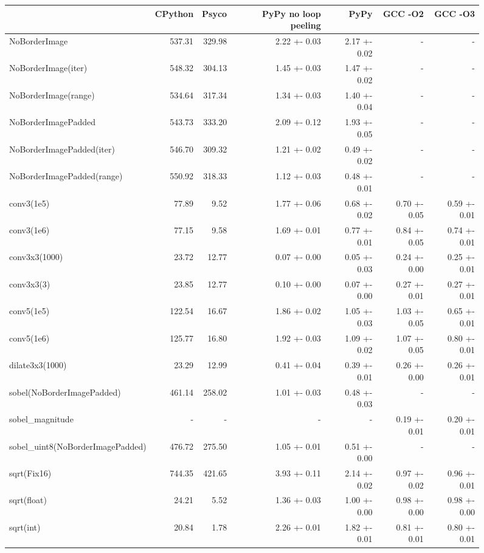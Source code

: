 \documentclass[preprint]{sigplanconf}
\begin{document}
\begin{figure}
\begin{center}
{\small
\begin{tabular}{|l|r|r|r|r|r|r|}
\hline
 & CPython & Psyco & PyPy no loop peeling & PyPy & GCC -O2 & GCC -O3\\
\hline
NoBorderImage & 537.31 & 329.98 & 2.22 +- 0.03 & 2.17 +- 0.02 & - & -\\
\hline
NoBorderImage(iter) & 548.32 & 304.13 & 1.45 +- 0.03 & 1.47 +- 0.02 & - & -\\
\hline
NoBorderImage(range) & 534.64 & 317.34 & 1.34 +- 0.03 & 1.40 +- 0.04 & - & -\\
\hline
NoBorderImagePadded & 543.73 & 333.20 & 2.09 +- 0.12 & 1.93 +- 0.05 & - & -\\
\hline
NoBorderImagePadded(iter) & 546.70 & 309.32 & 1.21 +- 0.02 & 0.49 +- 0.02 & - & -\\
\hline
NoBorderImagePadded(range) & 550.92 & 318.33 & 1.12 +- 0.03 & 0.48 +- 0.01 & - & -\\
\hline
conv3(1e5) & 77.89 & 9.52 & 1.77 +- 0.06 & 0.68 +- 0.02 & 0.70 +- 0.05 & 0.59 +- 0.01\\
\hline
conv3(1e6) & 77.15 & 9.58 & 1.69 +- 0.01 & 0.77 +- 0.01 & 0.84 +- 0.05 & 0.74 +- 0.01\\
\hline
conv3x3(1000) & 23.72 & 12.77 & 0.07 +- 0.00 & 0.05 +- 0.03 & 0.24 +- 0.00 & 0.25 +- 0.01\\
\hline
conv3x3(3) & 23.85 & 12.77 & 0.10 +- 0.00 & 0.07 +- 0.00 & 0.27 +- 0.01 & 0.27 +- 0.01\\
\hline
conv5(1e5) & 122.54 & 16.67 & 1.86 +- 0.02 & 1.05 +- 0.03 & 1.03 +- 0.05 & 0.65 +- 0.01\\
\hline
conv5(1e6) & 125.77 & 16.80 & 1.92 +- 0.03 & 1.09 +- 0.02 & 1.07 +- 0.05 & 0.80 +- 0.01\\
\hline
dilate3x3(1000) & 23.29 & 12.99 & 0.41 +- 0.04 & 0.39 +- 0.01 & 0.26 +- 0.00 & 0.26 +- 0.01\\
\hline
sobel(NoBorderImagePadded) & 461.14 & 258.02 & 1.01 +- 0.03 & 0.48 +- 0.03 & - & -\\
\hline
sobel\_magnitude & - & - & - & - & 0.19 +- 0.01 & 0.20 +- 0.01\\
\hline
sobel\_uint8(NoBorderImagePadded) & 476.72 & 275.50 & 1.05 +- 0.01 & 0.51 +- 0.00 & - & -\\
\hline
sqrt(Fix16) & 744.35 & 421.65 & 3.93 +- 0.11 & 2.14 +- 0.02 & 0.97 +- 0.02 & 0.96 +- 0.01\\
\hline
sqrt(float) & 24.21 & 5.52 & 1.36 +- 0.03 & 1.00 +- 0.00 & 0.98 +- 0.00 & 0.98 +- 0.00\\
\hline
sqrt(int) & 20.84 & 1.78 & 2.26 +- 0.01 & 1.82 +- 0.01 & 0.81 +- 0.01 & 0.80 +- 0.01\\
\hline

\end{tabular}
}
\end{center}
\end{figure}
\end{document}
